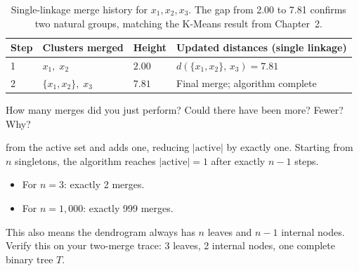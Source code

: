\begin{table}[ht]
\centering
\begin{tabular}{p{}p{}p{}p{}}
    \toprule
    \textbf{Step} & \textbf{Clusters merged} & \textbf{Height} & \textbf{Updated distances (single linkage)} \\
    \midrule
    1 & $x_1,\; x_2$
      & $2.00$
      & $d(\{x_1,x_2\},\,x_3){=}7.81$ \\
    2 & $\{x_1,x_2\},\; x_3$
      & $7.81$
      & Final merge; algorithm complete \\
    \bottomrule
\end{tabular}
\vspace{2em}
\caption{Single-linkage merge history for $x_1, x_2, x_3$. The gap from 2.00 to 7.81 confirms two natural groups, matching the K-Means result from Chapter~2.}
\label{tab:hc_merges}
\end{table}


How many merges did you just perform?
Could there have been more? Fewer? Why?

 from the active set and adds one, 
reducing $|\mathrm{active}|$ by exactly one.
Starting from $n$ singletons, the algorithm reaches $|\mathrm{active}|{=}1$ after 
exactly $n{-}1$ steps. 

\begin{itemize}
    \item For $n{=}3$: exactly 2 merges.
    \item For $n{=}1{,}000$: exactly 999 merges.
\end{itemize}


This also means the dendrogram always has $n$ leaves and $n{-}1$ internal nodes.
Verify this on your two-merge trace: 3 leaves, 2 internal nodes, one complete binary tree $T$.


\vspace{2.5em}

